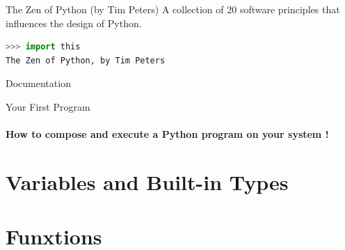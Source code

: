 \documentclass[compress, color = usenames, dvipsnames]{beamer}
\begin{document}
\begin{frame}[fragile]{The Zen of Python (by Tim Peters)}
A collection of 20 software principles that influences the design of Python.
\begin{lstlisting}[language=Python,style=myPYTHONstyle]
>>> import this
The Zen of Python, by Tim Peters
\end{lstlisting}



\end{frame}
\begin{frame}{Documentation}
    
\end{frame}

\begin{frame}{Your First Program}
\framesubtitle{How to compose and execute a Python program on your system !}
    
\end{frame}


\section[Variables and Types]{Variables and Built-in Types}



\section[Functions]{Funxtions}
\end{document}
